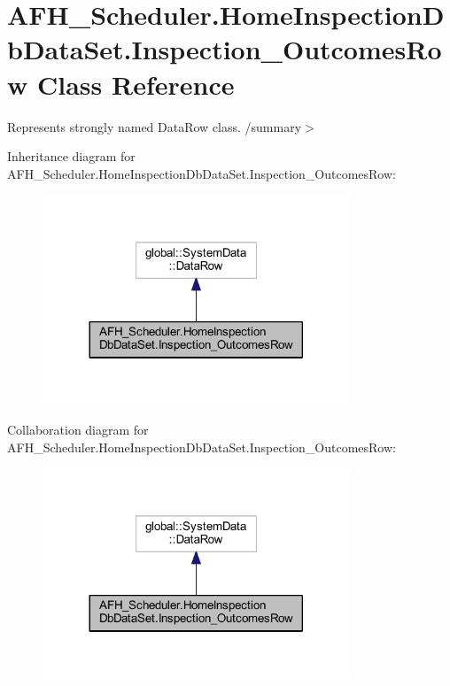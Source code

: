 \section{A\+F\+H\+\_\+\+Scheduler.\+Home\+Inspection\+Db\+Data\+Set.\+Inspection\+\_\+\+Outcomes\+Row Class Reference}
\label{class_a_f_h___scheduler_1_1_home_inspection_db_data_set_1_1_inspection___outcomes_row}


Represents strongly named Data\+Row class. /summary$>$  




Inheritance diagram for A\+F\+H\+\_\+\+Scheduler.\+Home\+Inspection\+Db\+Data\+Set.\+Inspection\+\_\+\+Outcomes\+Row\+:
\nopagebreak
\begin{figure}[H]
\begin{center}
\leavevmode
\includegraphics[width=260pt]{class_a_f_h___scheduler_1_1_home_inspection_db_data_set_1_1_inspection___outcomes_row__inherit__graph}
\end{center}
\end{figure}


Collaboration diagram for A\+F\+H\+\_\+\+Scheduler.\+Home\+Inspection\+Db\+Data\+Set.\+Inspection\+\_\+\+Outcomes\+Row\+:
\nopagebreak
\begin{figure}[H]
\begin{center}
\leavevmode
\includegraphics[width=260pt]{class_a_f_h___scheduler_1_1_home_inspection_db_data_set_1_1_inspection___outcomes_row__coll__graph}
\end{center}
\end{figure}

